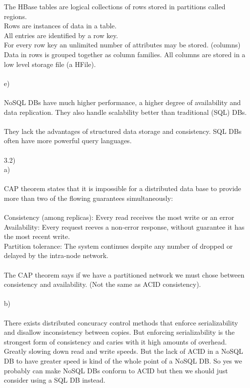 \documentclass[12pt, letterpaper, twoside]{article}
\begin{document}
The HBase tables are logical collections of rows stored in partitions called regions.\\
Rows are instances of data in a table.\\
All entries are identified by a row key.\\
For every row key an unlimited number of attributes may be stored. (columns)\\
Data in rows is grouped together as column families. All columns are stored in a low level storage file (a HFile).\\
\ \\
e)\\
\ \\
NoSQL DBs have much higher performance, a higher degree of availability and data replication. They also handle scalability better than traditional (SQL) DBs.\\
\ \\
They lack the advantages of structured data storage and consistency. SQL DBs often have more powerful query languages.\\
\newpage
\ \\
3.2)\\
a)\\
\ \\
CAP theorem states that it is impossible for a distributed data base to provide more than two of the flowing guarantees simultaneously:\\
\ \\
Consistency (among replicas): Every read receives the most write or an error\\
Availability: Every request reeves a non-error response, without guarantee it has the most recent write.\\
Partition tolerance: The system continues despite any number of dropped or delayed by the intra-node network.\\
\ \\
The CAP theorem says if we have a partitioned network we must chose between consistency and availability. (Not the same as ACID consistency).\\
\ \\
b)\\
\ \\
There exists distributed concuracy control methods that enforce serializability and disallow inconsistency between copies. But enforcing serializability is the strongest form of consistency and caries with it high amounts of overhead. Greatly slowing down read and write speeds. But the lack of ACID in a NoSQL DB to have greater speed is kind of the whole point of a NoSQL DB. So yes we probably can make NoSQL DBs conform to ACID but then we should just consider using a SQL DB instead.\\
\end{document}
